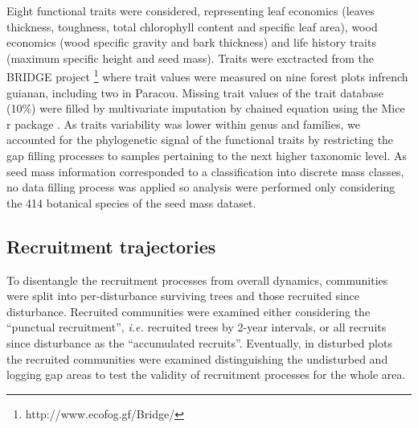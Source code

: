 \documentclass[fleqn,10pt]{ArtEcoFoG} %
\begin{document}
Eight functional traits were considered, representing leaf economics
(leaves thickness, toughness, total chlorophyll content and specific
leaf area), wood economics (wood specific gravity and bark thickness)
and life history traits (maximum specific height and seed mass). Traits
were exctracted from the BRIDGE project \footnote{http://www.ecofog.gf/Bridge/}
where trait values were measured on nine forest plots infrench guianan,
including two in Paracou. Missing trait values of the trait database
(10\%) were filled by multivariate imputation by chained equation using
the Mice r package \citep{Mice2011}. As traits variability was lower
within genus and families, we accounted for the phylogenetic signal of
the functional traits by restricting the gap filling processes to
samples pertaining to the next higher taxonomic level. As seed mass
information corresponded to a classification into discrete mass classes,
no data filling process was applied so analysis were performed only
considering the 414 botanical species of the seed mass dataset.

\subsection{Recruitment trajectories}\label{recruitment-trajectories}

To disentangle the recruitment processes from overall dynamics,
communities were split into per-disturbance surviving trees and those
recruited since disturbance. Recruited communities were examined either
considering the ``punctual recruitment'', \emph{i.e.} recruited trees by
2-year intervals, or all recruits since disturbance as the ``accumulated
recruits''. Eventually, in disturbed plots the recruited communities
were examined distinguishing the undisturbed and logging gap areas to
test the validity of recruitment processes for the whole area.
\end{document}
